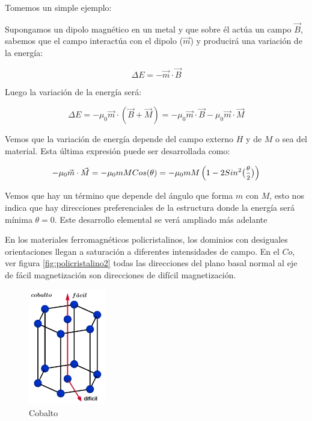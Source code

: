 Tomemos un simple ejemplo:

Supongamos un dipolo magnético en un metal y que sobre él actúa un campo $\vec{B}$, sabemos que el campo interactúa con el dipolo ($\vec{m}$) y producirá una variación de la energía:

\begin{equation}
\Delta E = -\vec{m} \cdot \vec{B}
\end{equation}

Luego la variación de la energía será:

\begin{equation}
\Delta E = -\mu_{0}\vec{m} \cdot (\vec{B} + \vec{M}) = -\mu_{0}\vec{m} \cdot \vec{B} -\mu_{0}\vec{m} \cdot \vec{M}
\end{equation}

Vemos que la variación de energía depende del campo externo $H$ y de $M$ o sea del material. Esta última expresión puede ser desarrollada como:

\begin{equation}
 -\mu_{0}\vec{m} \cdot \vec{M}  = -\mu_{0}m M Cos(\theta) = -\mu_{0}m M \left( 1-2 Sin^{2}\big(\mfrac {\theta}{2}\big) \right)  
\end{equation}

Vemos que hay un término que depende del ángulo que forma $m$ con $M$, esto nos indica que hay direcciones preferenciales de la estructura donde la energía será mínima $\theta = 0$. Este desarrollo elemental se verá ampliado más adelante


En los materiales ferromagnéticos policristalinos, los dominios con desiguales orientaciones llegan a saturación a diferentes intensidades de campo. En el $Co$, ver figura \ref{fig:policristalino2} todas las direcciones del plano basal normal al eje de fácil magnetización son direcciones de difícil magnetización.

\begin{figure}[H]
    \centering
    \includegraphics[width=0.3\textwidth]{./Figures/policristalino3}
	\caption{Cobalto}
	\label{fig:policristalino3}
\end{figure}

